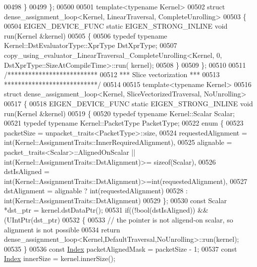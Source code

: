 \begin{DoxyCode}
00498   \}
00499 \};
00500 
00501 \textcolor{keyword}{template}<\textcolor{keyword}{typename} Kernel>
00502 \textcolor{keyword}{struct }dense\_assignment\_loop<Kernel, LinearTraversal, CompleteUnrolling>
00503 \{
00504   EIGEN\_DEVICE\_FUNC \textcolor{keyword}{static} EIGEN\_STRONG\_INLINE \textcolor{keywordtype}{void} run(Kernel &kernel)
00505   \{
00506     \textcolor{keyword}{typedef} \textcolor{keyword}{typename} Kernel::DstEvaluatorType::XprType DstXprType;
00507     copy\_using\_evaluator\_LinearTraversal\_CompleteUnrolling<Kernel, 0, DstXprType::SizeAtCompileTime>::run(
      kernel);
00508   \}
00509 \};
00510 
00511 \textcolor{comment}{/**************************}
00512 \textcolor{comment}{*** Slice vectorization ***}
00513 \textcolor{comment}{***************************/}
00514 
00515 \textcolor{keyword}{template}<\textcolor{keyword}{typename} Kernel>
00516 \textcolor{keyword}{struct }dense\_assignment\_loop<Kernel, SliceVectorizedTraversal, NoUnrolling>
00517 \{
00518   EIGEN\_DEVICE\_FUNC \textcolor{keyword}{static} EIGEN\_STRONG\_INLINE \textcolor{keywordtype}{void} run(Kernel &kernel)
00519   \{
00520     \textcolor{keyword}{typedef} \textcolor{keyword}{typename} Kernel::Scalar Scalar;
00521     \textcolor{keyword}{typedef} \textcolor{keyword}{typename} Kernel::PacketType PacketType;
00522     \textcolor{keyword}{enum} \{
00523       packetSize = unpacket\_traits<PacketType>::size,
00524       requestedAlignment = int(Kernel::AssignmentTraits::InnerRequiredAlignment),
00525       alignable = packet\_traits<Scalar>::AlignedOnScalar || int(Kernel::AssignmentTraits::DstAlignment)>=\textcolor{keyword}{
      sizeof}(Scalar),
00526       dstIsAligned = \textcolor{keywordtype}{int}(Kernel::AssignmentTraits::DstAlignment)>=int(requestedAlignment),
00527       dstAlignment = alignable ? int(requestedAlignment)
00528                                : int(Kernel::AssignmentTraits::DstAlignment)
00529     \};
00530     \textcolor{keyword}{const} Scalar *dst\_ptr = kernel.dstDataPtr();
00531     \textcolor{keywordflow}{if}((!\textcolor{keywordtype}{bool}(dstIsAligned)) && (UIntPtr(dst\_ptr) %
00532     \{
00533       \textcolor{comment}{// the pointer is not aligend-on scalar, so alignment is not possible}
00534       \textcolor{keywordflow}{return} dense\_assignment\_loop<Kernel,DefaultTraversal,NoUnrolling>::run(kernel);
00535     \}
00536     \textcolor{keyword}{const} \hyperlink{namespace_eigen_a62e77e0933482dafde8fe197d9a2cfde}{Index} packetAlignedMask = packetSize - 1;
00537     \textcolor{keyword}{const} \hyperlink{namespace_eigen_a62e77e0933482dafde8fe197d9a2cfde}{Index} innerSize = kernel.innerSize();

\end{DoxyCode}
